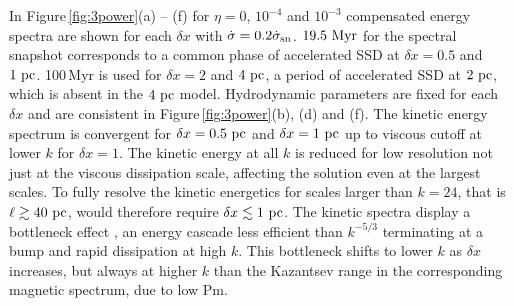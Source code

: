 \documentclass[preprint2]{aastex63}
\newcommand\SNr{\dot\sigma_{\rm sn}}
\newcommand\pc{~ {\rm pc}}
\newcommand\dx{ {\delta x}}
\newcommand\Myr{~ {\rm Myr}}
\begin{document}
 In Figure\,\ref{fig:3power}(a) -- (f) for $\eta=0$, $10^{-4}$ and $10^{-3}$
 compensated energy spectra are shown for each $\dx$ with $\dot\sigma=0.2\SNr$.
 $19.5\Myr$ for the spectral snapshot corresponds to a common phase of
 accelerated SSD at $\dx=0.5$ and $1\pc$.
 100\,Myr is used for $\dx=2$ and $4\pc$, a period of accelerated SSD at
 $2\pc$, which is absent in the $4\pc$ model.
 Hydrodynamic parameters are fixed for each $\dx$ and are consistent
 in Figure\,\ref{fig:3power}(b), (d) and (f).
 The kinetic energy spectrum is convergent for $\dx=0.5\pc$ and $\dx=1\pc$ up
 to viscous cutoff at lower $k$ for $\dx=1$.
 The kinetic energy at all $k$ is reduced for low resolution not just at
 the viscous dissipation scale, affecting the solution even at the largest 
 scales.
 To fully resolve the kinetic energetics for scales larger than $k=24$, that is
 $\ell\gtrsim40\pc$, would therefore require $\dx\lesssim1\pc$.
 The kinetic spectra display a bottleneck effect \citep{Falkovich94,HBD03},
 an energy cascade less efficient than $k^{-5/3}$ terminating at a bump and
 rapid dissipation at high $k$.
 This bottleneck shifts to lower $k$ as $\dx$ increases, but always at higher
 $k$ than the Kazantsev range in the corresponding magnetic spectrum, due to
 low Pm.
\end{document}
